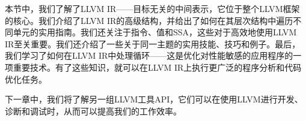 本节中，我们了解了LLVM IR——目标无关的中间表示，它位于整个LLVM框架的核心。我们介绍了LLVM IR的高级结构，并给出了如何在其层次结构中遍历不同单元的实用指南。我们还关注于指令、值和SSA，这些对于高效地使用LLVM IR至关重要。我们还介绍了一些关于同一主题的实用技能、技巧和例子。最后，我们学习了如何在LLVM IR中处理循环——这是优化对性能敏感的应用程序的一项重要技术。有了这些知识，就可以在LLVM IR上执行更广泛的程序分析和代码优化任务。

下一章中，我们将了解另一组LLVM工具API，它们可以在使用LLVM进行开发、诊断和调试时，从而可以提高我们的工作效率。
